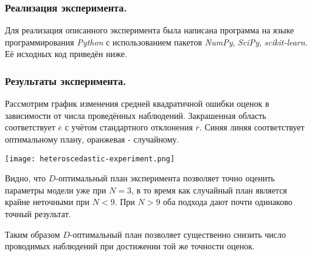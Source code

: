 \subsubsection{Реализация эксперимента.}
Для реализация описанного эксперимента была написана программа на языке программирования \textit{Python} с использованием пакетов \textit{NumPy}, \textit{SciPy}, \textit{scikit-learn}.
Её исходных код приведён ниже.


\subsubsection{Результаты эксперимента.}
Рассмотрим график изменения средней квадратичной ошибки оценок в зависимости от числа проведённых наблюдений. Закрашенная область соответствует $\overline e$ с учётом стандартного отклонения $\overline r$. Синяя линяя соответствует оптимальному плану, оранжевая - случайному.
\begin{center}\texttt{[image: heteroscedastic-experiment.png]}\end{center} 

Видно, что $D$-оптимальный план эксперимента позволяет точно оценить параметры модели уже при $N=3$, в то время как случайный план является крайне неточными при $N < 9$. При $N > 9$ оба подхода дают почти одинаково точный результат.

Таким образом $D$-оптимальный план позволяет существенно снизить число проводимых наблюдений при достижении той же точности оценок.



